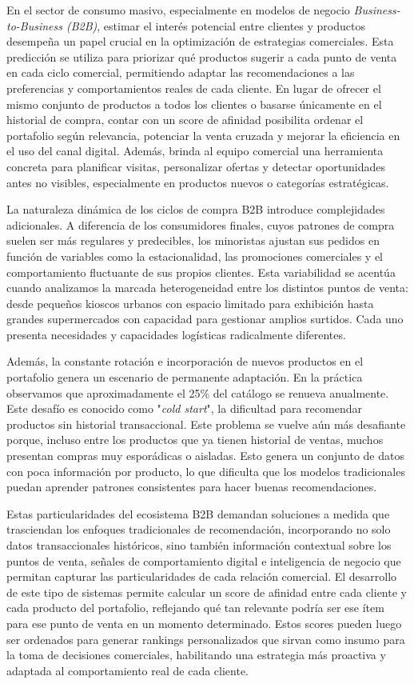 \documentclass[
11pt, %
]{charter}
\begin{document}
En el sector de consumo masivo, especialmente en modelos de negocio \textit{Business-to-Business (B2B)}, estimar el interés potencial entre clientes y productos desempeña un papel crucial en la optimización de estrategias comerciales.  Esta predicción se utiliza para priorizar qué productos sugerir a cada punto de venta en cada ciclo comercial, permitiendo adaptar las recomendaciones a las preferencias y comportamientos reales de cada cliente. En lugar de ofrecer el mismo conjunto de productos a todos los clientes o basarse únicamente en el historial de compra, contar con un score de afinidad posibilita ordenar el portafolio según relevancia, potenciar la venta cruzada y mejorar la eficiencia en el uso del canal digital. Además, brinda al equipo comercial una herramienta concreta para planificar visitas, personalizar ofertas y detectar oportunidades antes no visibles, especialmente en productos nuevos o categorías estratégicas.

La naturaleza dinámica de los ciclos de compra B2B introduce complejidades adicionales. A diferencia de los consumidores finales, cuyos patrones de compra suelen ser más regulares y predecibles, los minoristas ajustan sus pedidos en función de variables como la estacionalidad, las promociones comerciales y el comportamiento fluctuante de sus propios clientes. Esta variabilidad se acentúa cuando analizamos la marcada heterogeneidad entre los distintos puntos de venta: desde pequeños kioscos urbanos con espacio limitado para exhibición hasta grandes supermercados con capacidad para gestionar amplios surtidos. Cada uno presenta necesidades y capacidades logísticas radicalmente diferentes.

Además, la constante rotación e incorporación de nuevos productos en el portafolio genera un escenario de permanente adaptación. En la práctica observamos que aproximadamente el 25\% del catálogo se renueva anualmente. Este desafío es conocido como "\textit{cold start}", la dificultad para recomendar productos sin historial transaccional. Este problema se vuelve aún más desafiante porque, incluso entre los productos que ya tienen historial de ventas, muchos presentan compras muy esporádicas o aisladas. Esto genera un conjunto de datos con poca información por producto, lo que dificulta que los modelos tradicionales puedan aprender patrones consistentes para hacer buenas recomendaciones.

Estas particularidades del ecosistema B2B demandan soluciones a medida que trasciendan los enfoques tradicionales de recomendación, incorporando no solo datos transaccionales históricos, sino también información contextual sobre los puntos de venta, señales de comportamiento digital e inteligencia de negocio que permitan capturar las particularidades de cada relación comercial. El desarrollo de este tipo de sistemas permite calcular un score de afinidad entre cada cliente y cada producto del portafolio, reflejando qué tan relevante podría ser ese ítem para ese punto de venta en un momento determinado. Estos scores pueden luego ser ordenados para generar rankings personalizados que sirvan como insumo para la toma de decisiones comerciales, habilitando una estrategia más proactiva y adaptada al comportamiento real de cada cliente.
\end{document}
